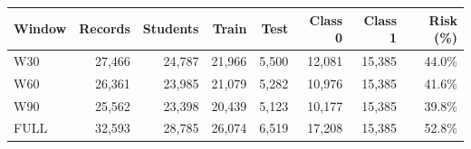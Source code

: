 \small
\setlength{\tabcolsep}{4pt}
\begin{tabular}{@{}lrrrrrrr@{}}
\toprule
Window & Records & Students & Train & Test & Class 0 & Class 1 & Risk (\%) \\
\midrule
W30 & 27,466 & 24,787 & 21,966 & 5,500 & 12,081 & 15,385 & 44.0\% \\
W60 & 26,361 & 23,985 & 21,079 & 5,282 & 10,976 & 15,385 & 41.6\% \\
W90 & 25,562 & 23,398 & 20,439 & 5,123 & 10,177 & 15,385 & 39.8\% \\
FULL & 32,593 & 28,785 & 26,074 & 6,519 & 17,208 & 15,385 & 52.8\% \\
\bottomrule
\end{tabular}

